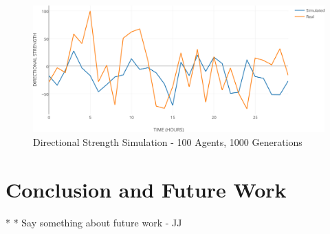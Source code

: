 \documentclass[a4paper,twoside]{article}
\begin{document}
\begin{figure}[h!]
\begin{center}
\includegraphics[width=1.00\columnwidth]{figures/ds-sim-100agents-1000gen/ds-sim-100agents-1000gen}
\caption{{\label{ds-prediction-1000}Directional Strength Simulation - 100 Agents, 1000 Generations%
}}
\end{center}
\end{figure}

\section{Conclusion and Future Work}
\label{conclusions}



* * Say something about future work - JJ
\end{document}
